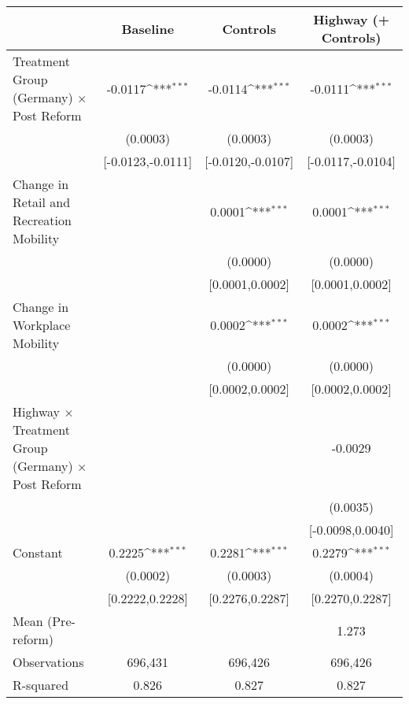 {
\def\sym#1{\ifmmode^{#1}\else\(^{#1}\)\fi}
\begin{tabular}{l*{3}{c}}
\toprule
                    &\multicolumn{1}{c}{Baseline}&\multicolumn{1}{c}{Controls}&\multicolumn{1}{c}{Highway (+ Controls)}\\
\midrule
Treatment Group (Germany) $\times$ Post Reform&     -0.0117\sym{***}&     -0.0114\sym{***}&     -0.0111\sym{***}\\
                    &    (0.0003)         &    (0.0003)         &    (0.0003)         \\
                    &[-0.0123,-0.0111]         &[-0.0120,-0.0107]         &[-0.0117,-0.0104]         \\
Change in Retail and Recreation Mobility&                     &      0.0001\sym{***}&      0.0001\sym{***}\\
                    &                     &    (0.0000)         &    (0.0000)         \\
                    &                     &[0.0001,0.0002]         &[0.0001,0.0002]         \\
Change in Workplace Mobility&                     &      0.0002\sym{***}&      0.0002\sym{***}\\
                    &                     &    (0.0000)         &    (0.0000)         \\
                    &                     &[0.0002,0.0002]         &[0.0002,0.0002]         \\
Highway $\times$ Treatment Group (Germany) $\times$ Post Reform&                     &                     &     -0.0029         \\
                    &                     &                     &    (0.0035)         \\
                    &                     &                     &[-0.0098,0.0040]         \\
Constant            &      0.2225\sym{***}&      0.2281\sym{***}&      0.2279\sym{***}\\
                    &    (0.0002)         &    (0.0003)         &    (0.0004)         \\
                    &[0.2222,0.2228]         &[0.2276,0.2287]         &[0.2270,0.2287]         \\
\midrule
Mean (Pre-reform)   &                     &                     &       1.273         \\
Observations        &     696,431         &     696,426         &     696,426         \\
R-squared           &       0.826         &       0.827         &       0.827         \\
\bottomrule
\end{tabular}
}
